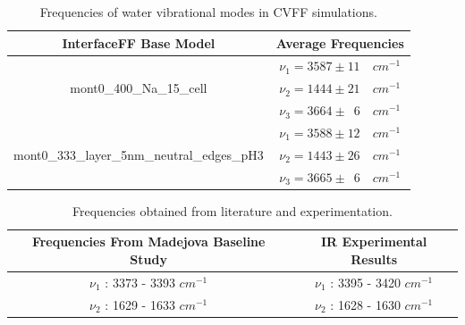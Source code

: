 		\begin{table}
			\centering
			\caption{Frequencies of water vibrational modes in CVFF simulations.}
			\label{tab:frequencies}
			\begin{tabular}{|c|c|}
			\hline
			\textbf{InterfaceFF Base Model} & \textbf{Average Frequencies} \\
			\hline
			\hline
			\multirow{3}{*}{mont0\_400\_Na\_15\_cell} & $\nu_1 = 3587 \pm 11\quad cm^{-1} $\\ & $\nu_2 = 1444 \pm 21 \quad cm^{-1}$ \\ & $\nu_3 = 3664 \pm \,\,\,6 \quad cm^{-1}$\\
			\hline
			\multirow{3}{*}{mont0\_333\_layer\_5nm\_neutral\_edges\_pH3} & $\nu_1 = 3588 \pm 12\quad cm^{-1} $\\ & $\nu_2 = 1443 \pm 26 \quad cm^{-1}$\\ & $\nu_3 = 3665 \pm \,\,\,6 \quad cm^{-1}$\\
			\hline
			\end{tabular}
		\end{table}

		\begin{table}
			\centering
			\caption{Frequencies obtained from literature and experimentation.}
			\label{tab:frequency_comparison}
			\begin{tabular}{|c|c|}
			\hline
			\rule{0pt}{2.5ex} \textbf{Frequencies From Madejova Baseline Study \cite{madejova2001baseline}} & \textbf{IR Experimental Results} \\
			\hline
			\hline
			\rule{0pt}{2.5ex} $\nu_1$ : 3373 - 3393 $cm^{-1}$ & $\nu_1$ : 3395 - 3420 $cm^{-1}$ \\
			\rule{0pt}{2.5ex} $\nu_2$ : 1629 - 1633 $cm^{-1}$ & $\nu_2$ : 1628 - 1630 $cm^{-1}$ \\
			\hline
			\end{tabular}
		\end{table}


